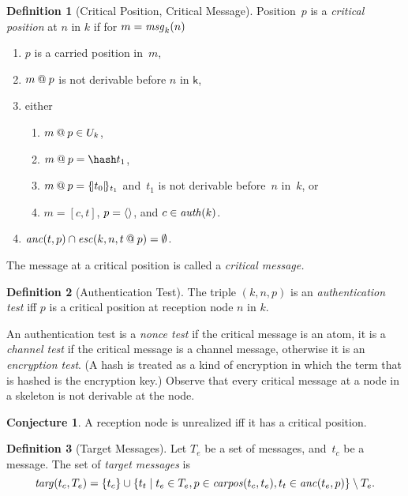 \documentclass[12pt]{report}
\theoremstyle{definition}
\newtheorem{defn}{Definition}[chapter]
\newtheorem{conj}[thm]{Conjecture}
\newcommand{\auth}{\fn{auth}}
\newcommand{\msg}{\fn{msg}}
\newcommand{\skel}{\mathsf{k}}
\begin{document}
\begin{defn}[Critical Position, Critical Message]\label{def:critical position}
  Position~$p$ is a \emph{critical position}
  at $n$ in $k$ if for $m=\msg_k(n)$
\begin{enumerate}
\item $p$ is a carried position in~$m$,
\item $m\mathbin{@} p$ is not derivable before $n$ in $\skel$,
\item either
  \begin{enumerate}
  \item $m\mathbin{@} p\in U_k$,
  \item $m\termat p=\hash t_1$,
  \item $m\mathbin{@} p=\{\!|t_0|\!\}_{t_1}$ and~$t_1$ is not derivable
    before~$n$ in~$k$, or
  \item $m=[c,t]$, $p=\langle\rangle$, and $c\in\auth(k)$.
  \end{enumerate}
  \label{item:nonce, encryption, or channel}
\item $\operatorname{\mathit{anc}}(t,p)\cap \operatorname{\mathit{esc}}(k,n,t\mathbin{@} p)=\emptyset$.
\end{enumerate}
The message at a critical position is called a \emph{critical message.}
\end{defn}

\begin{defn}[Authentication Test]\label{def:authentication test}
  The triple $(k,n,p)$ is an \emph{authentication test} iff $p$ is a critical position at
  reception node $n$ in $k$.
\end{defn}

An authentication test is a \emph{nonce test} if the
critical message is an atom, it is a \emph{channel
  test} if the critical message is a channel message, otherwise it is
an \emph{encryption test}.  (A hash
is treated as a kind of encryption in which the term that is hashed is
the encryption key.)  Observe that every critical message at a node in
a skeleton is not derivable at the node.

\begin{conj}
A reception node is unrealized iff it has a critical position.
\end{conj}

\begin{defn}[Target Messages]
Let $T_e$ be a set of messages, and~$t_c$ be a message.  The set of
\emph{target messages} is
$$\operatorname{\mathit{targ}}(t_c,T_e)=\{t_c\}\cup\{t_t\mid t_e\in T_e,p\in\operatorname{\mathit{carpos}}(t_c, t_e),
t_t\in\operatorname{\mathit{anc}}(t_e,p)\}\setminus T_e.$$
\end{defn}
\end{document}
